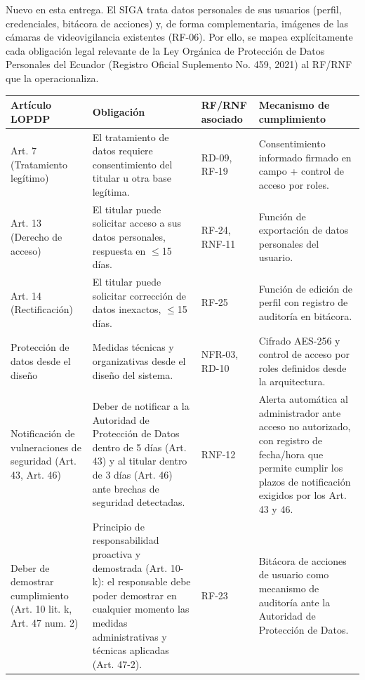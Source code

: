 
Nuevo en esta entrega. El SIGA trata datos personales de sus usuarios (perfil, credenciales, bitácora de acciones) y, de forma complementaria, imágenes de las cámaras de videovigilancia existentes (RF-06). Por ello, se mapea explícitamente cada obligación legal relevante de la Ley Orgánica de Protección de Datos Personales del Ecuador (Registro Oficial Suplemento No. 459, 2021) al RF/RNF que la operacionaliza.




\begingroup
\small
\begin{longtable}{|p{3.9cm}|p{3.9cm}|p{3.9cm}|p{3.9cm}|}
\hline
Artículo LOPDP & Obligación & RF/RNF asociado & Mecanismo de cumplimiento \\ \hline
Art. 7 (Tratamiento legítimo) & El tratamiento de datos requiere consentimiento del titular u otra base legítima. & RD-09, RF-19 & Consentimiento informado firmado en campo + control de acceso por roles. \\ \hline
Art. 13 (Derecho de acceso) & El titular puede solicitar acceso a sus datos personales, respuesta en $\leq$15 días. & RF-24, RNF-11 & Función de exportación de datos personales del usuario. \\ \hline
Art. 14 (Rectificación) & El titular puede solicitar corrección de datos inexactos, $\leq$15 días. & RF-25 & Función de edición de perfil con registro de auditoría en bitácora. \\ \hline
Protección de datos desde el diseño & Medidas técnicas y organizativas desde el diseño del sistema. & NFR-03, RD-10 & Cifrado AES-256 y control de acceso por roles definidos desde la arquitectura. \\ \hline
Notificación de vulneraciones de seguridad (Art. 43, Art. 46) & Deber de notificar a la Autoridad de Protección de Datos dentro de 5 días (Art. 43) y al titular dentro de 3 días (Art. 46) ante brechas de seguridad detectadas. & RNF-12 & Alerta automática al administrador ante acceso no autorizado, con registro de fecha/hora que permite cumplir los plazos de notificación exigidos por los Art. 43 y 46. \\ \hline
Deber de demostrar cumplimiento (Art. 10 lit. k, Art. 47 num. 2) & Principio de responsabilidad proactiva y demostrada (Art. 10-k): el responsable debe poder demostrar en cualquier momento las medidas administrativas y técnicas aplicadas (Art. 47-2). & RF-23 & Bitácora de acciones de usuario como mecanismo de auditoría ante la Autoridad de Protección de Datos. \\ \hline

\end{longtable}
